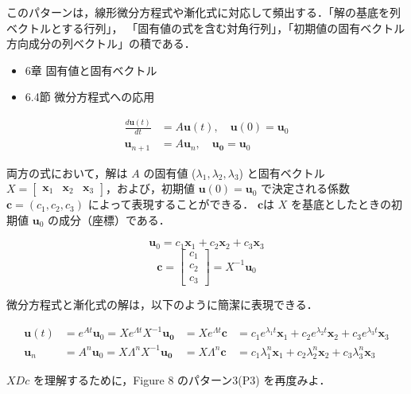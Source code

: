 \documentclass[letterpaper]{article}
\begin{document}
このパターンは，線形微分方程式や漸化式に対応して頻出する．「解の基底を列ベクトルとする行列」，
「固有値の式を含む対角行列」，「初期値の固有ベクトル方向成分の列ベクトル」の積である．

\begin{itemize}
  \item 6章 固有値と固有ベクトル
  \item 6.4節 微分方程式への応用
\end{itemize} 

\begin{align*}
  \frac{d \bm{u}(t) }{dt} &= A \bm{u}(t), \quad \bm{u}(0) =\bm{u}_0\\
  \bm{u}_{n+1} &= A \bm{u}_n, \quad \bm{u_0} = \bm{u}_0
\end{align*}

両方の式において，解は $A$ の固有値 ($\lambda_1, \lambda_2, \lambda_3$) と固有ベクトル
$X=\begin{bmatrix} \bm{x}_1 & \bm{x}_2 & \bm{x}_3 \end{bmatrix}$，および，初期値
$\bm{u}(0)=\bm{u}_0$ で決定される係数$\bm{c}=(c_1, c_2, c_3)$ によって表現することができる．
$\bm{c}$は $X$ を基底としたときの初期値 $\bm{u}_0$ の成分（座標）である．

\begin{equation*}
  \bm{u}_0 = c_1 \bm{x}_1 + c_2 \bm{x}_2 + c_3 \bm{x}_3
\end{equation*}
\begin{equation*}
  \bm{c} =
  \begin{bmatrix}
    c_1\\
    c_2\\
    c_3
  \end{bmatrix} = X^{-1} \bm{u}_0
\end{equation*}

微分方程式と漸化式の解は，以下のように簡潔に表現できる．

\begin{align*}
  \bm{u}(t) &= e^{At} \bm{u}_0 = X e^{\Lambda t} X^{-1} \bm{u_0} &= X e^{\Lambda t} \bm{c} &= c_1 e^{\lambda_1 t} \bm{x}_1 + c_2 e^{\lambda_2 t} \bm{x}_2 + c_3 e^{\lambda_3 t} \bm{x}_3\\
  \bm{u}_n &= A^n \bm{u}_0 = X \Lambda^n X^{-1} \bm{u_0} &= X \Lambda^n \bm{c} &= c_1 \lambda_1^n \bm{x}_1 + c_2 \lambda_2^n \bm{x}_2 + c_3 \lambda_3^n \bm{x}_3
\end{align*}

$XDc$ を理解するために，Figure 8 のパターン3(P3) を再度みよ．
\end{document}
